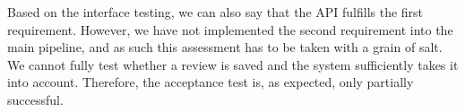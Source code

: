Based on the interface testing, we can also say that the API fulfills the first requirement. However, we have not implemented the second requirement into the main pipeline, and as such this assessment has to be taken with a grain of salt. We cannot fully test whether a review is saved and the system sufficiently takes it into account. Therefore, the acceptance test is, as expected, only partially successful. 

